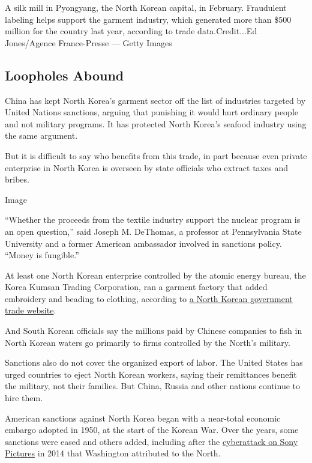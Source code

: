 A silk mill in Pyongyang, the North Korean capital, in February.
Fraudulent labeling helps support the garment industry, which generated
more than \$500 million for the country last year, according to trade
data.Credit...Ed Jones/Agence France-Presse --- Getty Images

\hypertarget{loopholes-abound}{%
\subsection{Loopholes Abound}\label{loopholes-abound}}

China has kept North Korea's garment sector off the list of industries
targeted by United Nations sanctions, arguing that punishing it would
hurt ordinary people and not military programs. It has protected North
Korea's seafood industry using the same argument.

But it is difficult to say who benefits from this trade, in part because
even private enterprise in North Korea is overseen by state officials
who extract taxes and bribes.

Image

``Whether the proceeds from the textile industry support the nuclear
program is an open question,'' said Joseph M. DeThomas, a professor at
Pennsylvania State University and a former American ambassador involved
in sanctions policy. ``Money is fungible.''

At least one North Korean enterprise controlled by the atomic energy
bureau, the Korea Kumsan Trading Corporation, ran a garment factory that
added embroidery and beading to clothing, according to
\href{http://www.naenara.com.kp/ch/trade/?company+15+31}{a North Korean
government trade website}.

And South Korean officials say the millions paid by Chinese companies to
fish in North Korean waters go primarily to firms controlled by the
North's military.

Sanctions also do not cover the organized export of labor. The United
States has urged countries to eject North Korean workers, saying their
remittances benefit the military, not their families. But China, Russia
and other nations continue to hire them.

American sanctions against North Korea began with a near-total economic
embargo adopted in 1950, at the start of the Korean War. Over the years,
some sanctions were eased and others added, including after the
\href{https://www.nytimes3xbfgragh.onion/2014/12/18/world/asia/us-links-north-korea-to-sony-hacking.html}{cyberattack
on Sony Pictures} in 2014 that Washington attributed to the North.

